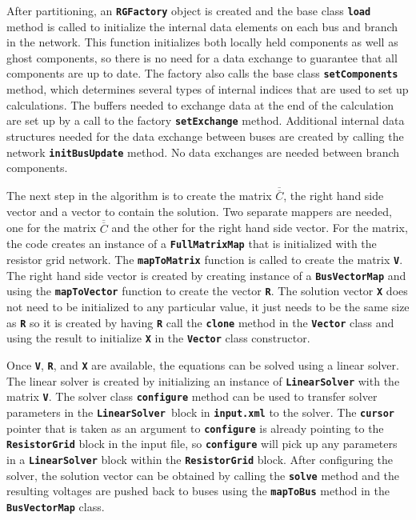 \documentclass[12pt]{report} %
\begin{document}
After partitioning, an \texttt{\textbf{RGFactory}} object is created and the base class \texttt{\textbf{load}} method is called to initialize the internal data elements on each bus and branch in the network. This function initializes both locally held components as well as ghost components, so there is no need for a data exchange to guarantee that all components are up to date. The factory also calls the base class \texttt{\textbf{setComponents}} method, which determines several types of internal indices that are used to set up calculations. The buffers needed to exchange data at the end of the calculation are set up by a call to the factory \texttt{\textbf{setExchange}} method. Additional internal data structures needed for the data exchange between buses are created by calling the network \texttt{\textbf{initBusUpdate}} method. No data exchanges are needed between branch components.

The next step in the algorithm is to create the matrix $\overline{\overline{C}}$, the right hand side vector and a vector to contain the solution. Two separate mappers are needed, one for the matrix $\overline{\overline{C}}$ and the other for the right hand side vector. For the matrix, the code creates an instance of a \texttt{\textbf{FullMatrixMap}} that is initialized with the resistor grid network. The \texttt{\textbf{mapToMatrix}} function is called to create the matrix \texttt{\textbf{V}}. The right hand side vector is created by creating instance of a \texttt{\textbf{BusVectorMap}} and using the \texttt{\textbf{mapToVector}} function to create the vector \texttt{\textbf{R}}. The solution vector \texttt{\textbf{X}} does not need to be initialized to any particular value, it just needs to be the same size as \texttt{\textbf{R}} so it is created by having \texttt{\textbf{R}} call the \texttt{\textbf{clone}} method in the \texttt{\textbf{Vector}} class and using the result to initialize \texttt{\textbf{X}} in the \texttt{\textbf{Vector}} class constructor.

Once \texttt{\textbf{V}}, \texttt{\textbf{R}}, and \texttt{\textbf{X}} are available, the equations can be solved using a linear solver. The linear solver is created by initializing an instance of \texttt{\textbf{LinearSolver}} with the matrix \texttt{\textbf{V}}. The solver class \texttt{\textbf{configure}} method can be used to transfer solver parameters in the \texttt{\textbf{LinearSolver }}block in \texttt{\textbf{input.xml}} to the solver. The \texttt{\textbf{cursor}} pointer  that is taken as an argument to \texttt{\textbf{configure}} is already pointing to the \texttt{\textbf{ResistorGrid}} block in the input file, so \texttt{\textbf{configure}} will pick up any parameters in a \texttt{\textbf{LinearSolver}} block within the \texttt{\textbf{ResistorGrid}} block. After configuring the solver, the solution vector can be obtained by calling the \texttt{\textbf{solve}} method and the resulting voltages are pushed back to buses using the \texttt{\textbf{mapToBus}} method in the \texttt{\textbf{BusVectorMap}} class.
\end{document}
